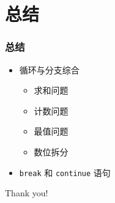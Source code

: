 \section{总结}

\begin{frame}[fragile]
    \frametitle{总结}

    \begin{itemize}
        \item 循环与分支综合
            \begin{itemize}
                \item 求和问题
                \item 计数问题
                \item 最值问题
                \item 数位拆分
            \end{itemize}
        \item \lstinline|break| 和 \lstinline|continue| 语句
    \end{itemize}
\end{frame}

\begin{frame}
    \begin{center}
        {\Huge Thank you!}
    \end{center}
\end{frame}


